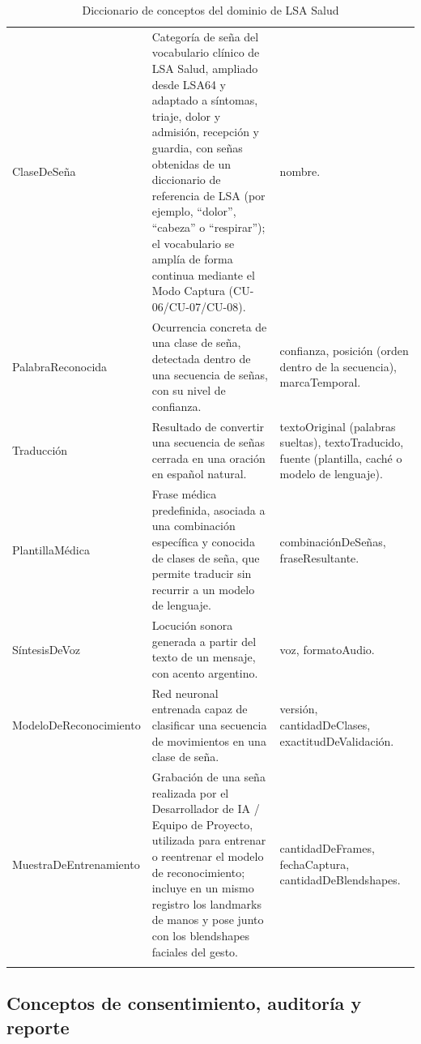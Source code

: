 \begin{longtable}{p{3.6cm} p{5.4cm} p{5.4cm}}
    Clase\-De\-Seña &
    Categoría de seña del vocabulario clínico de LSA Salud, ampliado desde
    LSA64 y adaptado a síntomas, triaje, dolor y admisión, recepción y
    guardia, con señas obtenidas de un diccionario de referencia de LSA (por ejemplo,
    ``dolor'', ``cabeza'' o ``respirar''); el vocabulario se amplía de forma
    continua mediante el Modo Captura (CU-06/CU-07/CU-08). &
    nombre. \\

    Palabra\-Reconocida &
    Ocurrencia concreta de una clase de seña, detectada dentro de una
    secuencia de señas, con su nivel de confianza. &
    confianza, posición (orden dentro de la secuencia), marcaTemporal. \\

    Traducción &
    Resultado de convertir una secuencia de señas cerrada en una oración
    en español natural. &
    textoOriginal (palabras sueltas), textoTraducido, fuente (plantilla,
    caché o modelo de lenguaje). \\

    Plantilla\-Médica &
    Frase médica predefinida, asociada a una combinación específica y
    conocida de clases de seña, que permite traducir sin recurrir a un
    modelo de lenguaje. &
    combinaciónDeSeñas, fraseResultante. \\

    Síntesis\-De\-Voz &
    Locución sonora generada a partir del texto de un mensaje, con acento
    argentino. &
    voz, formatoAudio. \\

    Modelo\-De\-Reconocimiento &
    Red neuronal entrenada capaz de clasificar una secuencia de
    movimientos en una clase de seña. &
    versión, cantidadDeClases, exactitudDeValidación. \\

    Muestra\-De\-Entrenamiento &
    Grabación de una seña realizada por el Desarrollador de IA / Equipo de
    Proyecto, utilizada para entrenar o reentrenar el modelo de
    reconocimiento; incluye en un mismo registro los landmarks de manos y
    pose junto con los blendshapes faciales del gesto. &
    cantidadDeFrames, fechaCaptura, cantidadDeBlendshapes. \\
    \bottomrule
    \caption{Diccionario de conceptos del dominio de LSA Salud}
    \label{tab:diccionario-conceptos}
\end{longtable}

\subsection{Conceptos de consentimiento, auditoría y reporte}
\label{sec:dom-pendientes}

